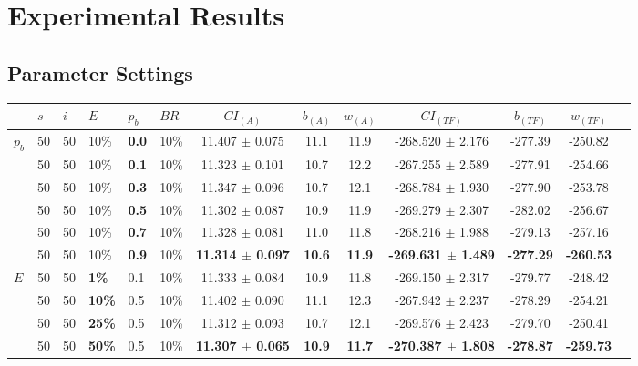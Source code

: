 \chapter{Experimental Results}
\label{appendixC}

\section{Parameter Settings}

\begin{sidewaystable}
    \begin{tabular}{|l|l|l|l|l|l||c|c|c|c|c|c|c|}
    \hline
    ~ & $s$ & $i$ & $E$ & $p_{b}$ & $BR$ & $CI_{(A)}$ & $b_{(A)}$ & $w_{(A)}$ & $CI_{(TF)}$ & $b_{(TF)}$ & $w_{(TF)}$\\
    \hline
    $p_{b}$ & 50 & 50 & 10\% & \textbf{0.0} & 10\% & 11.407 $\pm$ 0.075 & 11.1 & 11.9 & -268.520 $\pm$ 2.176 & -277.39 & -250.82 \\
    ~ & 50 & 50 & 10\% & \textbf{0.1} & 10\% & 11.323 $\pm$ 0.101 & 10.7 & 12.2 & -267.255 $\pm$ 2.589 & -277.91 & -254.66 \\
    ~ & 50 & 50 & 10\% & \textbf{0.3} & 10\% & 11.347 $\pm$ 0.096 & 10.7 & 12.1 & -268.784 $\pm$ 1.930 & -277.90 & -253.78 \\
    ~ & 50 & 50 & 10\% & \textbf{0.5} & 10\% & 11.302 $\pm$ 0.087 & 10.9 & 11.9 & -269.279 $\pm$ 2.307 & -282.02 & -256.67\\
    ~ & 50 & 50 & 10\% & \textbf{0.7} & 10\% & 11.328 $\pm$ 0.081 & 11.0 & 11.8 & -268.216 $\pm$ 1.988 & -279.13 & -257.16\\
    ~ & 50 & 50 & 10\% & \textbf{0.9} & 10\% & \textbf{11.314 $\pm$ 0.097} & \textbf{10.6} & \textbf{11.9} & \textbf{-269.631 $\pm$ 1.489} & \textbf{-277.29} & \textbf{-260.53}\\
    \hline
    $E$ & 50 & 50 & \textbf{1\%} & 0.1 & 10\% & 11.333 $\pm$ 0.084 & 10.9 & 11.8 & -269.150 $\pm$ 2.317 & -279.77 & -248.42 \\
    ~ & 50 & 50 & \textbf{10\%} & 0.5 & 10\% & 11.402 $\pm$ 0.090 & 11.1 & 12.3 & -267.942 $\pm$ 2.237 & -278.29 & -254.21 \\
    ~ & 50 & 50 & \textbf{25\%} & 0.5 & 10\% & 11.312 $\pm$ 0.093 & 10.7 & 12.1 & -269.576 $\pm$ 2.423 & -279.70 & -250.41 \\
    ~ & 50 & 50 & \textbf{50\%} & 0.5 & 10\% & \textbf{11.307 $\pm$ 0.065} & \textbf{10.9} & \textbf{11.7} & \textbf{-270.387 $\pm$ 1.808}  & \textbf{-278.87} & \textbf{-259.73} \\

\end{tabular}
\end{sidewaystable}
